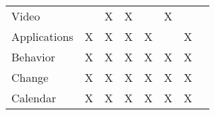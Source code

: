 \begin{table}[tbph]
\begin{minipage}{\textwidth}
\begin{tabular}{p{3cm}ccccccl}
            Video                                                        &
                                                                         & X
                                                                         & X                                                     &
                                                                         & X                                                     &
                                                                         & \cite{gemmell2002mylifebits,}
            \tabularnewline

            \rowcolor[rgb]{ .851,  .851,  .851}
            Applications                                                 & X                                                     & X                                                                                          & X                                                       & X                                                                                          &                                                       & X                                                                                         & \cite{hellerstein2017ground,provsearch}
            \tabularnewline

            Behavior                                                     & X                                                     & X                                                                                          & X                                                       & X                                                                                          & X                                                     & X                                                                                         & \cite{hellerstein2017ground,provsearch}
            \tabularnewline

            \rowcolor[rgb]{ .851,  .851,  .851}
            Change                                                       & X                                                     & X                                                                                          & X                                                       & X                                                                                          & X                                                     & X                                                                                         & \cite{hellerstein2017ground,provsearch}
            \tabularnewline

            Calendar                                                     & X                                                     & X                                                                                          & X                                                       & X                                                                                          & X                                                     & X                                                                                         & \cite{kalokyri2017integration,vianna2014a,vianna2019searching}
            \tabularnewline


\end{tabular}
\end{minipage}
\end{table}

